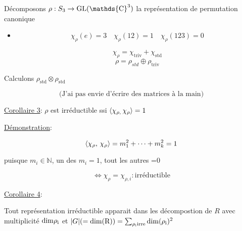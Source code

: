 \begin{tcolorbox}[title=Exemple]
	 Décomposons $\rho: S_3 \to \rm{GL}(\mathds{C}^3)$ la représentation de permutation canonique 
	 \begin{itemize}
	 	\item \[ \chi_{\rho}(e) = 3 \quad \chi_{\rho} (12) =1 \quad \chi_{\rho}(123) = 0  \]

			\[ \chi_{\rho} = \chi_{\text{triv}} + \chi_{\text{std}}   \]
			\[ \rho = \rho_{std} \oplus \rho_{\text{triv}}  \]
	 \end{itemize}
\end{tcolorbox}

\begin{tcolorbox}[title=]
	Calculons $\rho_{\text{std}} \otimes \rho_{\text{std}}  $
	
	\[ \text{(J'ai pas envie d'écrire des matrices à la main)}  \] 
\end{tcolorbox}


\underline{Corollaire 3}: $\rho$ est irréductible ssi $\expval{\chi_{\rho,} \, \chi_{\rho} } = 1$

\underline{Démonstration}: 

\[ \expval{\chi_{\rho} ,\, \chi_{\rho} } = m_1^{2}+ \dotsb + m_k^{2} = 1 \]

puisque $m_i \in \mathds{N}$, un des $m_i =1 $, tout les autres =0

\[ \iff \chi_{\rho} = \chi_{\rho,i}: \text{irréductible}  \]


\underline{Corollaire 4}:

Tout représentation irréductible apparait dans les décompostion de $R$ avec multiplicité $\rm{dim} \rho_i $ et $\abs{G} (= \rm{dim}(R)) = \sum_{\rho_i \text{irre} } \rm{\dim}(\rho_i ) ^2   $





